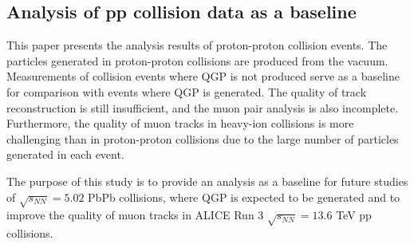     \subsection{Analysis of pp collision data as a baseline}
    This paper presents the analysis results of proton-proton collision events. The particles generated in proton-proton collisions are produced from the vacuum. Measurements of collision events where QGP is not produced serve as a baseline for comparison with events where QGP is generated. The quality of track reconstruction is still insufficient, and the muon pair analysis is also incomplete. Furthermore, the quality of muon tracks in heavy-ion collisions is more challenging than in proton-proton collisions due to the large number of particles generated in each event.  

    The purpose of this study is to provide an analysis as a baseline for future studies of $\sqrt{s_{NN}} = 5.02$ PbPb collisions, where QGP is expected to be generated and to improve the quality of muon tracks in ALICE Run 3 $\sqrt{s_{NN}} = 13.6$ TeV pp collisions.